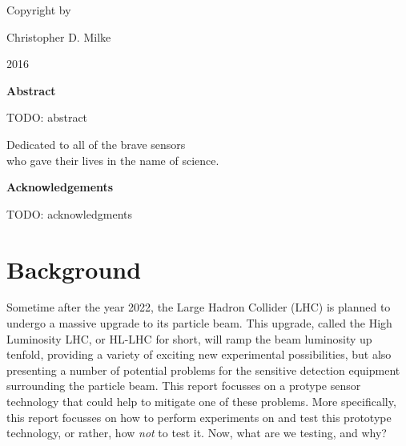 \documentclass{report}
\begin{document}
    \newpage \begin{center} 
        \vspace*{\fill}
        Copyright \textcopyright by

        Christopher D. Milke 

        2016
        \vspace*{\fill}
    \end{center} \newpage


        \begin{center} \LARGE \textbf{Abstract} \end{center}

        TODO: abstract

    \newpage


    \tableofcontents


    \newpage \vspace*{\fill}
        \begin{center} \begin{large}
            Dedicated to all of the brave sensors\\
            who gave their lives in the name of science.
        \end{large} \end{center}
    \vspace*{\fill} \newpage \vspace*{\fill}
        \begin{center} \begin{large}
            \large \textbf{Acknowledgements} \vspace{\baselineskip}

            TODO: acknowledgments

        \end{large} \end{center}
    \vspace*{\fill} \newpage





     \setcounter{page}{1}
    \chapter{ Background }
        Sometime after the year 2022, the Large Hadron Collider (LHC) is planned to undergo a massive upgrade to its particle beam. This upgrade, called the High Luminosity LHC, or HL-LHC for short, will ramp the beam luminosity up tenfold, providing a variety of exciting new experimental possibilities, but also presenting a number of potential problems for the sensitive detection equipment surrounding the particle beam. This report focusses on a protype sensor technology that could help to mitigate one of these problems. More specifically, this report focusses on how to perform experiments on and test this prototype technology, or rather, how \textit{not} to test it. Now, what are we testing, and why?
            
\end{document}
